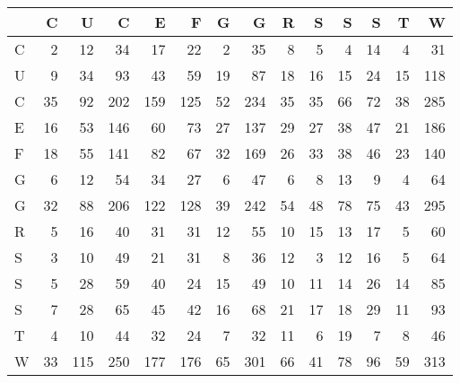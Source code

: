 \begin{tabular}{lrrrrrrrrrrrrr}
\toprule
{} &   C &    U &    C &    E &    F &   G &    G &   R &   S &   S &   S &   T &    W \\
\midrule
C &   2 &   12 &   34 &   17 &   22 &   2 &   35 &   8 &   5 &   4 &  14 &   4 &   31 \\
U &   9 &   34 &   93 &   43 &   59 &  19 &   87 &  18 &  16 &  15 &  24 &  15 &  118 \\
C &  35 &   92 &  202 &  159 &  125 &  52 &  234 &  35 &  35 &  66 &  72 &  38 &  285 \\
E &  16 &   53 &  146 &   60 &   73 &  27 &  137 &  29 &  27 &  38 &  47 &  21 &  186 \\
F &  18 &   55 &  141 &   82 &   67 &  32 &  169 &  26 &  33 &  38 &  46 &  23 &  140 \\
G &   6 &   12 &   54 &   34 &   27 &   6 &   47 &   6 &   8 &  13 &   9 &   4 &   64 \\
G &  32 &   88 &  206 &  122 &  128 &  39 &  242 &  54 &  48 &  78 &  75 &  43 &  295 \\
R &   5 &   16 &   40 &   31 &   31 &  12 &   55 &  10 &  15 &  13 &  17 &   5 &   60 \\
S &   3 &   10 &   49 &   21 &   31 &   8 &   36 &  12 &   3 &  12 &  16 &   5 &   64 \\
S &   5 &   28 &   59 &   40 &   24 &  15 &   49 &  10 &  11 &  14 &  26 &  14 &   85 \\
S &   7 &   28 &   65 &   45 &   42 &  16 &   68 &  21 &  17 &  18 &  29 &  11 &   93 \\
T &   4 &   10 &   44 &   32 &   24 &   7 &   32 &  11 &   6 &  19 &   7 &   8 &   46 \\
W &  33 &  115 &  250 &  177 &  176 &  65 &  301 &  66 &  41 &  78 &  96 &  59 &  313 \\
\bottomrule
\end{tabular}
